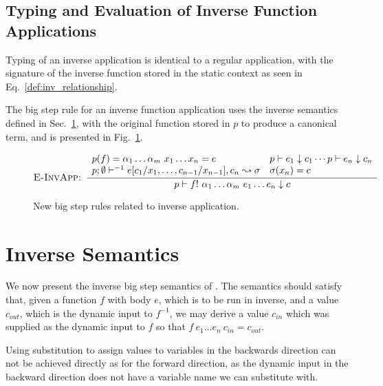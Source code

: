 \subsection{Typing and Evaluation of Inverse Function
Applications}\label{sec:inverse_typing_evaluation}

Typing of an inverse application is identical to a regular application, with
the signature of the inverse function stored in the static context as seen in
Eq.~\ref{def:inv_relationship}.

The big step rule for  an inverse function application uses the inverse
semantics defined in Sec.~\ref{sec:inverse_semantics}, with the original
function stored in $p$ to produce a canonical term, and is presented in
Fig.~\ref{fig:inverse_call_evaluation}.

\begin{figure}[htp]
\begin{align*}
\textsc{E-InvApp: }
  \dfrac
    {\begin{array}{ll}
        p(f) = \alpha_1 \dots \alpha_m~x_1 \dots x_n = e &
        p \vdash e_1 \downarrow c_1 \cdots p \vdash e_n \downarrow c_n \\
        p; \emptyset \vdash^{-1} e[c_1 / x_1, \dots, c_{n-1} / x_{n-1}], c_n \leadsto \sigma &
        \sigma(x_n) = c
     \end{array}}
     {p \vdash f!~\alpha_1 \dots \alpha_m~e_1 \dots e_n \downarrow c}
\end{align*}
\caption{New big step rules related to inverse application.}\label{fig:inverse_call_evaluation}
\end{figure}

\section{Inverse Semantics}\label{sec:inverse_semantics}

We now present the inverse big step semantics of \rfunc. The semantics should
satisfy that, given a function $f$ with body $e$, which is to be run in
inverse, and a value $c_{out}$, which is the dynamic input to $f^{-1}$, we may
derive a value $c_{in}$ which was supplied as the dynamic input to $f$ so
that $f~e_1 \dots e_n~c_{in} = c_{out}$.

Using substitution to assign values to variables in the backwards direction can
not be achieved directly as for the forward direction, as the dynamic input in
the backward direction does not have a variable name we can substitute with.

